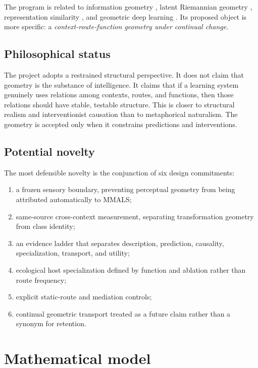 \documentclass[11pt,a4paper]{article}
\begin{document}
The program is related to information geometry \citep{amari1998natural}, latent Riemannian geometry \citep{arvanitidis2018latent,shao2018riemannian}, representation similarity \citep{kornblith2019cka}, and geometric deep learning \citep{bronstein2021geometric}. Its proposed object is more specific: a \emph{context-route-function geometry under continual change}.

\subsection{Philosophical status}

The project adopts a restrained structural perspective. It does not claim that geometry is the substance of intelligence. It claims that if a learning system genuinely uses relations among contexts, routes, and functions, then those relations should have stable, testable structure. This is closer to structural realism \citep{worrall1989structural} and interventionist causation \citep{woodward2003making} than to metaphorical naturalism. The geometry is accepted only when it constrains predictions and interventions.

\subsection{Potential novelty}

The most defensible novelty is the conjunction of six design commitments:

\begin{enumerate}
\item a frozen sensory boundary, preventing perceptual geometry from being attributed automatically to MMALS;
\item same-source cross-context measurement, separating transformation geometry from class identity;
\item an evidence ladder that separates description, prediction, causality, specialization, transport, and utility;
\item ecological host specialization defined by function and ablation rather than route frequency;
\item explicit static-route and mediation controls;
\item continual geometric transport treated as a future claim rather than a synonym for retention.
\end{enumerate}

\section{Mathematical model}
\end{document}

